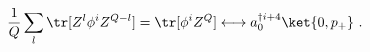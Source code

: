 \begin{equation}
 \frac{1}{Q} \sum_l \tr [Z^l \phi^i Z^{Q-l}] = \tr [\phi^i Z^Q ]
  \longleftrightarrow 
   a^{\dagger   i+4}_0 \ket{0,p_+} ~.
\label{sugrapart}
\end{equation}


